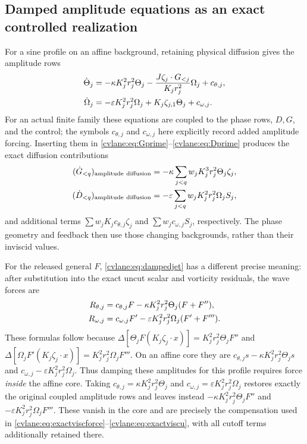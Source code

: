 \subsection{Damped amplitude equations as an exact controlled realization}
For a sine profile on an affine background, retaining physical
diffusion gives the amplitude rows
\begin{align}
 \dot\Theta_j&=-\kappa K_j^2r_j^2\Theta_j
 -\frac{J\zeta_j\cdot G_{<j}}{K_jr_j^2}\Omega_j+c_{\theta,j},\notag\\
 \dot\Omega_j&=-\varepsilon K_j^2r_j^2\Omega_j
 +K_j\zeta_{j,1}\Theta_j+c_{\omega,j}.
 \label{cvlane:eq:dampedjet}
\end{align}
For an actual finite family these equations are coupled to the
phase rows, $D,G$, and the control; the symbols $c_{\theta,j}$ and
$c_{\omega,j}$ here explicitly record added amplitude forcing.
Inserting them in \eqref{cvlane:eq:Gprime}--\eqref{cvlane:eq:Dprime} produces
the exact diffusion contributions
\begin{align}
 (\dot G_{<q})_{\rm amplitude\ diffusion}
 &=-\kappa\sum_{j<q}w_jK_j^3r_j^2\Theta_j\zeta_j,\notag\\
 (\dot D_{<q})_{\rm amplitude\ diffusion}
 &=-\varepsilon\sum_{j<q}w_jK_j^2r_j^2\Omega_jS_j,
 \label{cvlane:eq:parentdiffusion}
\end{align}
and additional terms $\sum w_jK_jc_{\theta,j}\zeta_j$ and
$\sum w_jc_{\omega,j}S_j$, respectively. The phase geometry
and feedback then use those changing backgrounds, rather than
their inviscid values.

For the released general $F$, \eqref{cvlane:eq:dampedjet} has a different
precise meaning: after substitution into the exact uncut scalar
and vorticity residuals, the wave forces are
\begin{align}
 R_{\theta,j}&=c_{\theta,j}F-
 \kappa K_j^2r_j^2\Theta_j(F+F''),\notag\\
 R_{\omega,j}&=c_{\omega,j}F'-
 \varepsilon K_j^2r_j^2\Omega_j(F'+F''').
 \label{cvlane:eq:dampedprofileforce}
\end{align}
These formulas follow because
$\Delta[\Theta_jF(K_j\zeta_j\cdot x)]
=K_j^2r_j^2\Theta_jF''$ and
$\Delta[\Omega_jF'(K_j\zeta_j\cdot x)]
=K_j^2r_j^2\Omega_jF'''$. On an affine core they are
$c_{\theta,j}s-\kappa K_j^2r_j^2\Theta_js$ and
$c_{\omega,j}-\varepsilon K_j^2r_j^2\Omega_j$.
Thus damping these amplitudes for this profile requires force
\emph{inside} the affine core. Taking
$c_{\theta,j}=\kappa K_j^2r_j^2\Theta_j$ and
$c_{\omega,j}=\varepsilon K_j^2r_j^2\Omega_j$ restores exactly
the original coupled amplitude rows and leaves instead
$-\kappa K_j^2r_j^2\Theta_jF''$ and
$-\varepsilon K_j^2r_j^2\Omega_jF'''$.
These vanish in the core and are precisely the compensation used
in \eqref{cvlane:eq:exactviscforce}--\eqref{cvlane:eq:exactviscu}, with all
cutoff terms additionally retained there.

